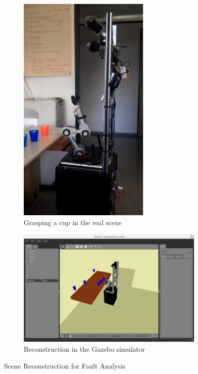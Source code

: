 \begin{figure}
  \centering
  \begin{subfigure}[b]{0.38\textwidth}
    \includegraphics[width=0.7\textwidth]{pics/klingen_real}
    \caption{Grasping a cup in the real scene}
    \label{fig:klingen_real}
  \end{subfigure}
  \begin{subfigure}[b]{0.58\textwidth}
    \includegraphics[width=\textwidth]{pics/klingen_sim}
    \caption{Reconstruction in the Gazebo simulator}
    \label{fig:klingen_sim}
  \end{subfigure}
  \caption[Scene Reconstruction for Fault Analysis]{Scene Reconstruction for Fault Analysis~\cite{KlingenDA}}
  \label{fig:klingen}
\end{figure}
